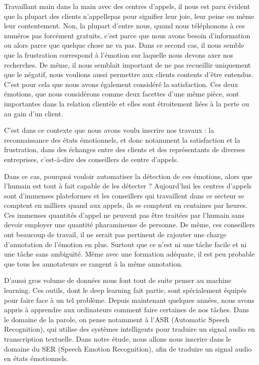 Travaillant main dans la main avec des centres d'appels, il nous est paru évident que la plupart des clients n'appellepas pour signifier leur joie, leur peine ou même leur contentement. Non, la plupart d'entre nous, quand nous téléphonons à ces numéros pas forcément gratuits, c'est parce que nous avons besoin d'information ou alors parce que quelque chose ne va pas. Dans ce second cas, il nous semble que la frustration correspond à l'émotion sur laquelle nous devons axer nos recherches. De même, il nous semblait important de ne pas recueillir uniquement que le négatif, nous voulions aussi permettre aux clients contents d'être entendus. C'est pour cela que nous avons également considéré la satisfaction. Ces deux émotions, que nous considérons comme deux facettes d'une même pièce, sont importantes dans la relation clientèle et elles sont étroitement liées à la perte ou au gain d'un client.

C'est dans ce contexte que nous avons voulu inscrire nos travaux : la reconnaissance des états émotionnels, et donc notamment la satisfaction et la frustration, dans des échanges entre des clients et des représentants de diverses entreprises, c'est-à-dire des conseillers de centre d'appels.

Dans ce cas, pourquoi vouloir automatiser la détection de ces émotions, alors que l'humain est tout à fait capable de les détecter ? Aujourd'hui les centres d'appels sont d'immenses plateformes et les conseillers qui travaillent dans ce secteur se comptent en milliers quand aux appels, ils se comptent en centaines par heures. Ces immenses quantités d'appel ne peuvent pas être traitées par l'humain sans devoir employer une quantité pharamineuse de personne. De même, ces conseillers ont beaucoup de travail, il ne serait pas pertinent de rajouter une charge d'annotation de l'émotion en plus. Surtout que ce n'est ni une tâche facile et ni une tâche sans ambiguïté. Même avec une formation adéquate, il est peu probable que tous les annotateurs se rangent à la même annotation.

D'aussi gros volume de données nous font tout de suite penser au machine learning. Ces outils, dont le deep learning fait partie, sont spécialement équipés pour faire face à un tel problème. Depuis maintenant quelques années, nous avons appris à apprendre aux ordinateurs comment faire certaines de nos tâches. Dans le domaine de la parole, on pense notamment à l'ASR (Automatic Speech Recognition), qui utilise des systèmes intelligents pour traduire un signal audio en transcription textuelle. Dans notre étude, nous allons nous inscrire dans le domaine du SER (Speech Emotion Recognition), afin de traduire un signal audio en états émotionnels.

